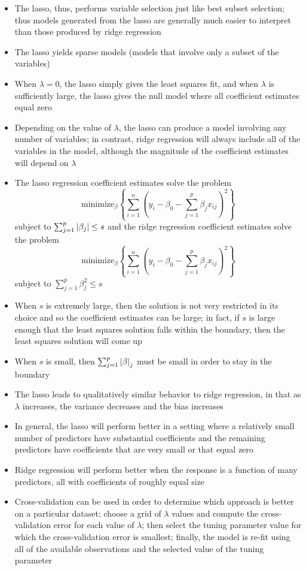 \documentclass[12pt]{article}
\begin{document}
\begin{itemize}
\item The lasso, thus, performs variable selection just like best subset selection; thus models generated from the lasso are generally much easier to interpret than those produced by ridge regression 
\item The lasso yields sparse models (models that involve only a subset of the variables) 
\item When $\lambda = 0$, the lasso simply gives the least squares fit, and when $\lambda$ is sufficiently large, the lasso gives the null model where all coefficient estimates equal zero 
\item Depending on the value of $\lambda$, the lasso can produce a model involving any number of variables; in contrast, ridge regression will always include all of the variables in the model, although the magnitude of the coefficient estimates will depend on $\lambda$ 
\item The lasso regression coefficient estimates solve the problem $$ \text{minimize}_\beta \left\{ \sum_{i=1}^n \left( y_i - \beta_0 - \sum_{j=1}^p \beta_jx_{ij}\right)^2\right\} $$ subject to $\sum_{j=1}^p \abs{\beta_j} \leq s$ and the ridge regression coefficient estimates solve the problem $$ \text{minimize}_\beta \left\{ \sum_{i=1}^n \left( y_i - \beta_0 - \sum_{j=1}^p \beta_jx_{ij}\right)^2\right\} $$ subject to $\sum_{j=1}^p \beta_j^2 \leq s$
\item When $s$ is extremely large, then the solution is not very restricted in its choice and so the coefficient estimates can be large; in fact, if $s$ is large enough that the least squares solution falls within the boundary, then the least squares solution will come up
\item When $s$ is small, then $\sum_{j=1}^p \abs{\beta}_j$ must be small in order to stay in the boundary 
\item The lasso leads to qualitatively similar behavior to ridge regression, in that as $\lambda$ increases, the variance decreases and the bias increases 
\item In general, the lasso will perform better in a setting where a relatively small number of predictors have substantial coefficients and the remaining predictors have coefficients that are very small or that equal zero 
\item Ridge regression will perform better when the response is a function of many predictors, all with coefficients of roughly equal size 
\item Cross-validation can be used in order to determine which approach is better on a particular dataset; choose a grid of $\lambda$ values and compute the cross-validation error for each value of $\lambda$; then select the tuning parameter value for which the cross-validation error is smallest; finally, the model is re-fit using all of the available observations and the selected value of the tuning parameter 

\end{itemize}
\end{document}
